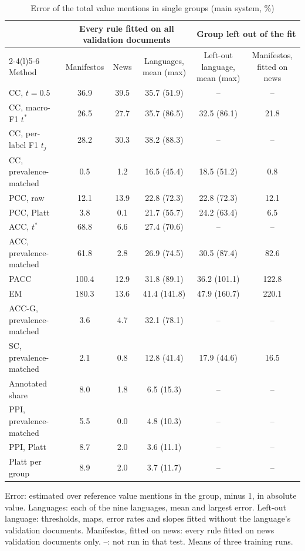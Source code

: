 \begin{table}[t]
\caption{Error of the total value mentions in single groups (main system, \%)}
\label{tab:group-totals}
\centering
\scriptsize
\setlength{\tabcolsep}{3pt}
\begin{tabular*}{\textwidth}{@{\extracolsep{\fill}}lccccc@{}}
\toprule
 & \multicolumn{3}{c}{Every rule fitted on all validation documents} & \multicolumn{2}{c}{Group left out of the fit} \\
\cmidrule(lr){2-4}\cmidrule(l){5-6}
Method & Manifestos & News & Languages, mean (max) & Left-out language, mean (max) & Manifestos, fitted on news \\
\midrule
CC, $t = 0.5$ & 36.9 & 39.5 & 35.7 (51.9) & -- & -- \\
CC, macro-F1 $t^*$ & 26.5 & 27.7 & 35.7 (86.5) & 32.5 (86.1) & 21.8 \\
CC, per-label F1 $t_j$ & 28.2 & 30.3 & 38.2 (88.3) & -- & -- \\
CC, prevalence-matched & 0.5 & 1.2 & 16.5 (45.4) & 18.5 (51.2) & 0.8 \\
PCC, raw & 12.1 & 13.9 & 22.8 (72.3) & 22.8 (72.3) & 12.1 \\
PCC, Platt & 3.8 & 0.1 & 21.7 (55.7) & 24.2 (63.4) & 6.5 \\
ACC, $t^*$ & 68.8 & 6.6 & 27.4 (70.6) & -- & -- \\
ACC, prevalence-matched & 61.8 & 2.8 & 26.9 (74.5) & 30.5 (87.4) & 82.6 \\
PACC & 100.4 & 12.9 & 31.8 (89.1) & 36.2 (101.1) & 122.8 \\
EM & 180.3 & 13.6 & 41.4 (141.8) & 47.9 (160.7) & 220.1 \\
ACC-G, prevalence-matched & 3.6 & 4.7 & 32.1 (78.1) & -- & -- \\
SC, prevalence-matched & 2.1 & 0.8 & 12.8 (41.4) & 17.9 (44.6) & 16.5 \\
Annotated share & 8.0 & 1.8 & 6.5 (15.3) & -- & -- \\
PPI, prevalence-matched & 5.5 & 0.0 & 4.8 (10.3) & -- & -- \\
PPI, Platt & 8.7 & 2.0 & 3.6 (11.1) & -- & -- \\
Platt per group & 8.9 & 2.0 & 3.7 (11.7) & -- & -- \\
\bottomrule
\end{tabular*}
\par\vspace{2pt}
\begin{minipage}{\textwidth}\scriptsize Error: estimated over reference value mentions in the group, minus 1, in absolute value. Languages: each of the nine languages, mean and largest error. Left-out language: thresholds, maps, error rates and slopes fitted without the language's validation documents. Manifestos, fitted on news: every rule fitted on news validation documents only. --: not run in that test. Means of three training runs.\end{minipage}
\end{table}
